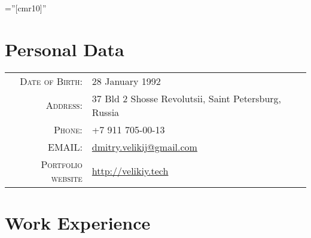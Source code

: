 \documentclass[a4paper,10pt]{article} %
\begin{document}
\pagestyle{empty} %

\font\fb=''[cmr10]'' %


\par{\bigskip\par} %

\section{Personal Data}

\begin{tabular}{rl}
    \textsc{Date of Birth:} & 28 January 1992 \\
    \textsc{Address:} &  37 Bld 2 Shosse Revolutsii, Saint Petersburg, Russia \\
    \textsc{Phone:} & +7 911 705-00-13\\
    \textsc{EMAIL:} &
    \href{mailto:dmitry.velikij@gmail.com}{dmitry.velikij@gmail.com}\\
    \textsc{Portfolio website} &
    \href{http://velikiy.tech}{http://velikiy.tech}
\end{tabular}


\section{Work Experience}

\end{document}
